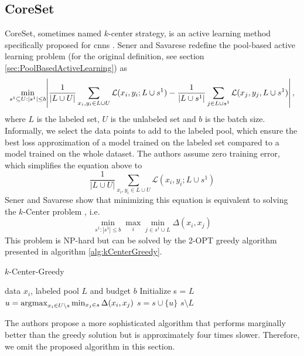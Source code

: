 \subsection{CoreSet}
\label{sec:Related_work:Active_Learning:CoreSet}
CoreSet, sometimes named $k$-center strategy, is an active learning method specifically proposed for \glspl{cnn} \cite{sener2017active}.
Sener and Savarese redefine the pool-based active learning problem (for the original definition, see 
section \ref{sec:PoolBasedActiveLearning}) as 
\begin{equation}
    \min_{s^1 \subseteq U: |s^1| \leq b } \abs{\frac{1}{|L \cup U|} \sum_{x_i,y_i \in L \cup U} \mathcal{L}(x_i,y_i;L \cup s^1) - \frac{1}{|L \cup s^1|} 
    \sum_{j \in L \cup s^1} \mathcal{L}(x_j,y_j,L \cup s^1)}, 
\end{equation}
where $L$ is the labeled set, $U$ is the unlabeled set and $b$ is the batch size.
Informally, we select the data points to add to the labeled pool, which ensure the best loss approximation
of a model trained on the labeled set compared to a model trained on the whole dataset. The authors assume zero training error, which
simplifies the equation above to
\begin{equation}
    \frac{1}{|L \cup U|} \sum_{x_i,y_i \in L \cup U} \mathcal{L}(x_i,y_i;L \cup s^1)
\end{equation}
Sener and Savarese show that minimizing this equation is equivalent to solving the $k$-Center problem \cite{wolf2011facility}, i.e.
\begin{equation}
    \min_{s^1: |s^1| \leq b} \max_i \min_{j \in s^1 \cup L}  \Delta (x_i,x_j)
\end{equation}
This problem is NP-hard but can be solved by the 2-OPT greedy algorithm presented in algorithm \ref{alg:kCenterGreedy}.
\begin{algorithm}
    \caption{$k$-Center-Greedy} \label{alg:kCenterGreedy}
    \begin{algorithmic}
        \Require data $x_i$, labeled pool $L$ and budget $b$
        \State Initialize s = $L$
        \Repeat
        \State $u = \operatorname*{\arg\!\max}_{x_i \in U \setminus s} \min_{x_j \in s} \Delta(x_i,x_j)$
        \State $s = s \cup \{u\}$
        \return $s \setminus L$
    \end{algorithmic}
\end{algorithm}
The authors propose a more sophisticated algorithm that performs marginally better than the greedy solution but is approximately 
four times slower. Therefore, we omit the proposed algorithm in this section.

